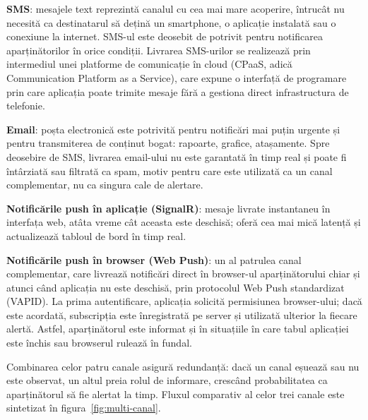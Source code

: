 \documentclass[12pt,a4paper,twoside]{article}
\begin{document}
\textbf{SMS}: mesajele text reprezintă canalul cu cea mai mare acoperire, întrucât nu necesită ca destinatarul să dețină un smartphone, o aplicație instalată sau o conexiune la internet. SMS-ul este deosebit de potrivit pentru notificarea aparținătorilor în orice condiții. Livrarea SMS-urilor se realizează prin intermediul unei platforme de comunicație în cloud (CPaaS, adică Communication Platform as a Service), care expune o interfață de programare prin care aplicația poate trimite mesaje fără a gestiona direct infrastructura de telefonie.

\textbf{Email}: poșta electronică este potrivită pentru notificări mai puțin urgente și pentru transmiterea de conținut bogat: rapoarte, grafice, atașamente. Spre deosebire de SMS, livrarea email-ului nu este garantată în timp real și poate fi întârziată sau filtrată ca spam, motiv pentru care este utilizată ca un canal complementar, nu ca singura cale de alertare.

\textbf{Notificările push în aplicație (SignalR)}: mesaje livrate instantaneu în interfața web, atâta vreme cât aceasta este deschisă; oferă cea mai mică latență și actualizează tabloul de bord în timp real.

\textbf{Notificările push în browser (Web Push)}: un al patrulea canal complementar, care livrează notificări direct în browser-ul aparținătorului chiar și atunci când aplicația nu este deschisă, prin protocolul Web Push standardizat (VAPID). La prima autentificare, aplicația solicită permisiunea browser-ului; dacă este acordată, subscripția este înregistrată pe server și utilizată ulterior la fiecare alertă. Astfel, aparținătorul este informat și în situațiile în care tabul aplicației este închis sau browserul rulează în fundal.

Combinarea celor patru canale asigură redundanță: dacă un canal eșuează sau nu este observat, un altul preia rolul de informare, crescând probabilitatea ca aparținătorul să fie alertat la timp. Fluxul comparativ al celor trei canale este sintetizat în figura~\ref{fig:multi-canal}.
\end{document}
